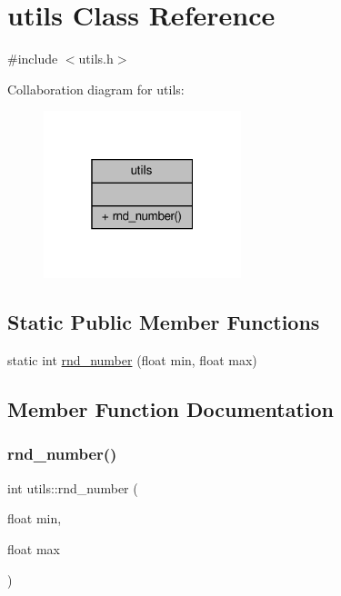\hypertarget{classutils}{}\section{utils Class Reference}
\label{classutils}


{\ttfamily \#include $<$utils.\+h$>$}



Collaboration diagram for utils\+:
\nopagebreak
\begin{figure}[H]
\begin{center}
\leavevmode
\includegraphics[width=163pt]{classutils__coll__graph}
\end{center}
\end{figure}
\subsection*{Static Public Member Functions}
\begin{DoxyCompactItemize}
\item 
static int \hyperlink{classutils_a4b8ed2e14db429698b2e2694c80bfb04}{rnd\+\_\+number} (float min, float max)
\end{DoxyCompactItemize}


\subsection{Member Function Documentation}
\mbox{\label{classutils_a4b8ed2e14db429698b2e2694c80bfb04}} 
\subsubsection{\texorpdfstring{rnd\+\_\+number()}{rnd\_number()}}
{\footnotesize\ttfamily int utils\+::rnd\+\_\+number (\begin{DoxyParamCaption}\item[{float}]{min,  }\item[{float}]{max }\end{DoxyParamCaption})\hspace{0.3cm}{\ttfamily [static]}}

